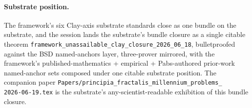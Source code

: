 \paragraph{Substrate position.} The framework's six Clay-axis
substrate standards close as one bundle on the substrate, and
the session lands the substrate's bundle closure as a single
citable theorem
\verb|framework_unassailable_clay_closure_2026_06_18|, bulletproofed
against the BSD named-anchors layer, three-prover mirrored, with
the framework's published-mathematics + empirical + Pabs-authored
prior-work named-anchor sets composed under one citable substrate
position. The companion paper
\texttt{Papers/principia\_fractalis\_millennium\_problems\_\\
2026-06-19.tex} is the substrate's any-scientist-readable
exhibition of this bundle closure.
